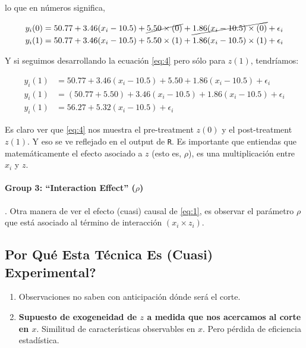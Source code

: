 \documentclass[10pt]{article}
\begin{document}
lo que en n\'umeros significa,

\begin{equation} \label{eq:4}
\begin{split}
y_{i}(0) &= 50.77 + 3.46(x_{i}-10.5) + \cancel{5.50\times(0)} + \cancel{1.86(x_{i}-10.5) \times (0)} +  \epsilon_{i} \\
y_{i}(1) &= 50.77 + 3.46(x_{i}-10.5) + 5.50\times(1) + 1.86(x_{i}-10.5) \times (1) +  \epsilon_{i}
\end{split}
\end{equation}

Y si seguimos desarrollando la ecuaci\'on \autoref{eq:4} pero s\'olo para $z(1)$, tendr\'iamos:

\begin{equation} \label{eq:5}
\begin{split}
y_{i}(1) &= 50.77 + 3.46(x_{i}-10.5) + 5.50 + 1.86(x_{i}-10.5) +  \epsilon_{i}\\
y_{i}(1) &= (50.77+5.50) + 3.46(x_{i}-10.5) + 1.86(x_{i}-10.5) +  \epsilon_{i}\\
y_{i}(1) &= 56.27 + 5.32(x_{i}-10.5) +  \epsilon_{i}
\end{split}
\end{equation}

Es claro ver que \autoref{eq:4} nos muestra el pre-treatment $z(0)$ y el post-treatment $z(1)$. Y eso se ve reflejado en el output de \texttt{R}. Es importante que entiendas que matem\'aticamente el efecto asociado a $z$ (esto es, $\rho$), es una multiplicaci\'on entre $x_{i}$ y $z$.

\paragraph{Group 3: ``Interaction Effect'' ($\rho$)}. Otra manera de ver el efecto (cuasi) causal de \autoref{eq:1}, es observar el par\'ametro $\rho$ que est\'a asociado al t\'ermino de interacci\'on $(x_{i}\times z_{i})$.

\subsection*{Por Qu\'e Esta T\'ecnica Es (Cuasi) Experimental?}

\begin{enumerate}
	\item Observaciones no saben con anticipaci\'on d\'onde ser\'a el corte.
	\item {\bf Supuesto de exogeneidad de $z$ a medida que nos acercamos al corte en $x$}.  Similitud de caracter\'isticas observables en $x$. Pero p\'erdida de eficiencia estad\'istica.
\end{enumerate}
\end{document}
